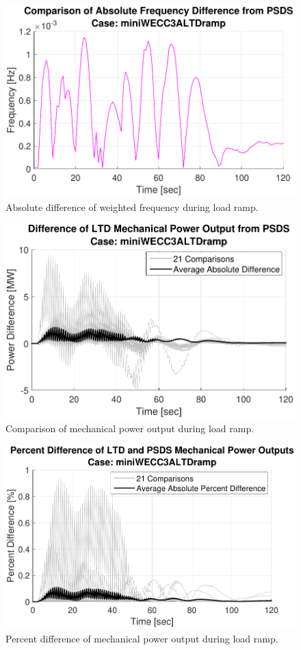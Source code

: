 \begin{figure}[!ht]
	\centering
	\includegraphics[width=\linewidth]{figures/miniWECC3ALTDrampRelF}
	\caption{Absolute difference of weighted frequency during load ramp.}
	\label{fig: rampFdif}
\end{figure}

\begin{figure}[!ht]
	\centering
	\includegraphics[width=\linewidth]{figures/miniWECC3ALTDrampPm2}
	\caption{Comparison of mechanical power output during load ramp.}
	\label{fig: rampPmdif}
\end{figure}

\begin{figure}[!ht]
	\centering
	\includegraphics[width=\linewidth]{figures/miniWECC3ALTDrampPm3}
	\caption{Percent difference of mechanical power output during load ramp.}
	\label{fig: rampPmPercentdif}
\end{figure}